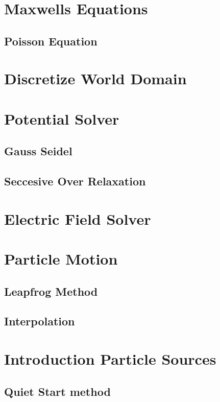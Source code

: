 \section{Maxwells Equations}

\subsection{Poisson Equation}

\section{Discretize World Domain}

\section{Potential Solver}

\subsection{Gauss Seidel}

\subsection{Seccesive Over Relaxation}

\section{Electric Field Solver}

\section{Particle Motion}

\subsection{Leapfrog Method}

\subsection{Interpolation}

\section{Introduction Particle Sources}

\subsection{Quiet Start method}

